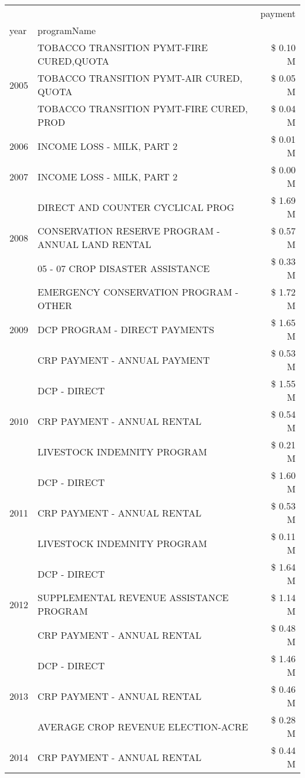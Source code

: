 \begin{tabular}{llr}
\toprule
 &  & payment \\
year & programName &  \\
\midrule
\multirow[t]{3}{*}{2005} & TOBACCO TRANSITION PYMT-FIRE CURED,QUOTA & \$ 0.10 M \\
 & TOBACCO TRANSITION PYMT-AIR CURED, QUOTA & \$ 0.05 M \\
 & TOBACCO TRANSITION PYMT-FIRE CURED, PROD & \$ 0.04 M \\
\cline{1-3}
2006 & INCOME LOSS - MILK, PART 2 & \$ 0.01 M \\
\cline{1-3}
2007 & INCOME LOSS - MILK, PART 2 & \$ 0.00 M \\
\cline{1-3}
\multirow[t]{3}{*}{2008} & DIRECT AND COUNTER CYCLICAL PROG & \$ 1.69 M \\
 & CONSERVATION RESERVE PROGRAM - ANNUAL LAND RENTAL & \$ 0.57 M \\
 & 05 - 07 CROP DISASTER ASSISTANCE & \$ 0.33 M \\
\cline{1-3}
\multirow[t]{3}{*}{2009} & EMERGENCY CONSERVATION PROGRAM - OTHER & \$ 1.72 M \\
 & DCP PROGRAM - DIRECT PAYMENTS & \$ 1.65 M \\
 & CRP PAYMENT - ANNUAL PAYMENT & \$ 0.53 M \\
\cline{1-3}
\multirow[t]{3}{*}{2010} & DCP - DIRECT & \$ 1.55 M \\
 & CRP PAYMENT - ANNUAL RENTAL & \$ 0.54 M \\
 & LIVESTOCK INDEMNITY PROGRAM & \$ 0.21 M \\
\cline{1-3}
\multirow[t]{3}{*}{2011} & DCP - DIRECT & \$ 1.60 M \\
 & CRP PAYMENT - ANNUAL RENTAL & \$ 0.53 M \\
 & LIVESTOCK INDEMNITY PROGRAM & \$ 0.11 M \\
\cline{1-3}
\multirow[t]{3}{*}{2012} & DCP - DIRECT & \$ 1.64 M \\
 & SUPPLEMENTAL REVENUE ASSISTANCE PROGRAM & \$ 1.14 M \\
 & CRP PAYMENT - ANNUAL RENTAL & \$ 0.48 M \\
\cline{1-3}
\multirow[t]{3}{*}{2013} & DCP - DIRECT & \$ 1.46 M \\
 & CRP PAYMENT - ANNUAL RENTAL & \$ 0.46 M \\
 & AVERAGE CROP REVENUE ELECTION-ACRE & \$ 0.28 M \\
\cline{1-3}
\multirow[t]{3}{*}{2014} & CRP PAYMENT - ANNUAL RENTAL & \$ 0.44 M \\

\end{tabular}
